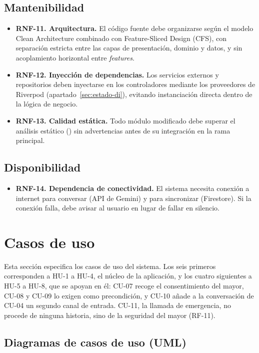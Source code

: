 \subsection*{Mantenibilidad}
\begin{itemize}
    \item \textbf{RNF-11. Arquitectura.} El código fuente debe organizarse según el modelo Clean Architecture combinado con Feature-Sliced Design (CFS), con separación estricta entre las capas de presentación, dominio y datos, y sin acoplamiento horizontal entre \textit{features}.
    \item \textbf{RNF-12. Inyección de dependencias.} Los servicios externos y repositorios deben inyectarse en los controladores mediante los proveedores de Riverpod (apartado~\ref{sec:estado-di}), evitando instanciación directa dentro de la lógica de negocio.
    \item \textbf{RNF-13. Calidad estática.} Todo módulo modificado debe superar el análisis estático () sin advertencias antes de su integración en la rama principal.
\end{itemize}

\subsection*{Disponibilidad}
\begin{itemize}
    \item \textbf{RNF-14. Dependencia de conectividad.} El sistema necesita conexión a internet para conversar (API de Gemini) y para sincronizar (Firestore). Si la conexión falla, debe avisar al usuario en lugar de fallar en silencio.
\end{itemize}

\section{Casos de uso}
\label{sec:casos-de-uso}
Esta sección especifica los casos de uso del sistema. Los seis primeros corresponden a HU-1 a HU-4, el núcleo de la aplicación, y los cuatro siguientes a HU-5 a HU-8, que se apoyan en él: CU-07 recoge el consentimiento del mayor, CU-08 y CU-09 lo exigen como precondición, y CU-10 añade a la conversación de CU-04 un segundo canal de entrada. CU-11, la llamada de emergencia, no procede de ninguna historia, sino de la seguridad del mayor (RF-11).

\subsection{Diagramas de casos de uso (UML)}

